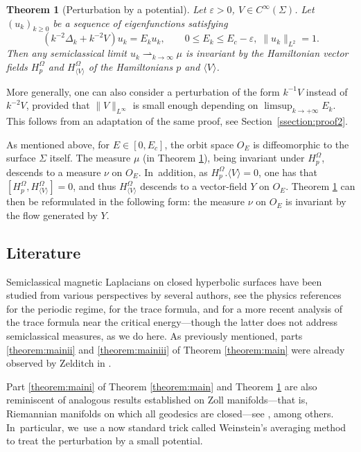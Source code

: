 \documentclass[JEP,XML,SOM,Unicode,published]{cedram}
\theoremstyle{plain}
\newtheorem{theorem}{Theorem}[section]
\theoremstyle{definition}
\let\eps\varepsilon
\begin{document}
\begin{theorem}[Perturbation by a potential]
\label{theorem:constant2}
Let $\eps > 0$, $V \in C^\infty(\Sigma)$. Let $(u_k)_{k \geq 0}$ be a sequence of eigenfunctions satisfying
\[
(k^{-2}\Delta_k + k^{-2}V) u_k = E_k u_k, \qquad 0 \leq E_k \leq E_c-\eps,\; \|u_k\|_{L^2}=1.
\]
Then any semiclassical limit $u_k \rightharpoonup_{k \to \infty} \mu$ is invariant by the Hamiltonian vector fields $H_p^\Omega$ and $H_{\langle V\rangle}^\Omega$ of the Hamiltonians $p$ and $\langle V\rangle$.
\end{theorem}

More generally, one can also consider a perturbation of the form $k^{-1}V$ instead of $k^{-2}V$, provided that $\|V\|_{L^\infty}$ is small enough depending on $\limsup_{k \to +\infty} E_k$. This follows from an adaptation of the same proof, see Section~\ref{ssection:proof2}.

As mentioned above, for $E \in [0, E_c]$, the orbit space $O_E$ is
diffeomorphic to the surface $\Sigma$ itself. The measure $\mu$ (in Theorem
\ref{theorem:constant2}), being invariant under $H_p^{\Omega}$, descends to a
measure $\nu$ on $O_E$. In~addition, as $H_p^{\Omega}. \langle V \rangle = 0$, one has that $[H_p^{\Omega},H_{\langle V \rangle}^\Omega]=0$, and thus $H_{\langle V \rangle}^\Omega$ descends to a vector-field $Y$ on $O_E$. Theorem \ref{theorem:constant2} can then be reformulated in the following form: the measure $\nu$ on $O_E$ is invariant by the flow generated by $Y$.

\subsection{Literature}

\label{ssection:literature}

Semiclassical magnetic Laplacians on closed hyperbolic surfaces have been studied from
various perspectives by several authors, see the physics references \cite{Comtet-86,Iengo-Li-94} for the periodic regime, \cite{Guillemin-Uribe-89} for
the trace formula, and \cite{Kordyukov-Taimanov-22} for a more recent analysis of the trace formula near the critical energy—though the latter does not address semiclassical measures, as we do here. As previously mentioned, parts \eqref{theorem:mainii} and \eqref{theorem:mainiii} of Theorem \ref{theorem:main} were already observed by Zelditch in \cite{Zelditch-92}.

Part \eqref{theorem:maini} of Theorem \ref{theorem:main} and Theorem \ref{theorem:constant2} are also reminiscent of analogous results established on Zoll manifolds—that is, Riemannian manifolds on which all geodesics are closed—see \cite{ColinDeVerdiere-79, Uribe-Zelditch-93, Zelditch-97,Macia-08,Macia-09,Zelditch-15, Macia-Riviere-16,Arnaiz-Macia-22,Arnaiz-Macia-22-2}, among others. In~particular, we~use a now standard trick called Weinstein's averaging method \cite{Weinstein-77} to treat the perturbation by a small potential.
\end{document}
